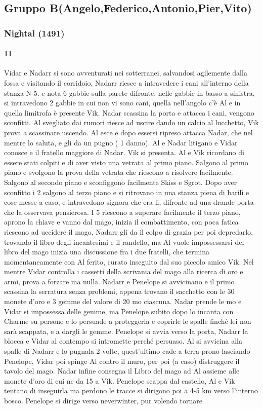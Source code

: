 \documentclass{article}
\begin{document}
          \subsection{Gruppo B(Angelo,Federico,Antonio,Pier,Vito)}
              \subsubsection{Nightal (1491)}
                  \paragraph{11}
Vidar e Nadarr si sono avventurati nei sotterranei, salvandosi agilemente dalla fossa e visitando il corridoio, Nadarr riesce a intravedere i cani all'interno della stanza N 5. e nota 6 gabbie sulla parete difronte, nelle gabbie in basso a sinistra, si intravedono 2 gabbie in cui non vi sono cani, quella nell'angolo c'è Al e in quella limitrofa è presente Vik. Nadar scassina la porta e attacca i cani, vengono sconfitti. Al svegliato dai rumori riesce ad uscire dando un calcio al lucchetto, Vik prova a scassinare uscendo. Al esce e dopo essersi ripreso attacca Nadar, che nel mentre lo saluta, e gli da un pugno ( 1 danno). Al e Nadar litigano e Vidar conosce e il fratello maggiore di Nadar. Vik si presenta. Al e Vik ricordano di essere stati colpiti e di aver visto una vetrata al primo piano. Salgono al primo piano e svolgono la prova della vetrata che riescono a risolvere facilmente. Salgono al secondo piano e sconfiggono facilmente Skiss e Sgrot. Dopo aver sconfitto i 2 salgono al terzo piano e si ritrovano in una stanza piena di barili e cose messe a caso, e intravedono signora che era li, difronte ad una drande porta che la osservava pensierosa. I 5 riescono a superare facilmente il terzo piano, aprono la chiave e vanno dal mago, inizia il combattimento, con poca fatica riescono ad uccidere il mago, Nadarr gli da il colpo di grazia per poi depredarlo, trovando il libro degli incantesimi e il randello, ma Al vuole impossessarsi del libro del mago inizia una discussione fra i due fratelli, che termina momentaneamente con Al ferito, curato inseguito dal suo piccolo amico Vik. Nel mentre Vidar controlla i cassetti della scrivania del mago alla ricerca di oro e armi, prova a forzare ma nulla. Nadarr e Penelope si avvicinano e il primo scassina la serratura senza problemi, appena trovano il sacchetto con le 30 monete d'oro e 3 gemme del valore di 20 mo ciascuna. Nadar prende le mo e Vidar si impossessa delle gemme, ma Penelope subito dopo lo incanta con Charme su persone e lo persuade a proteggerla e coprirle le spalle finché lei non sarà scappata, e a dargli le gemme. Penelope si avvia verso la porta, Nadarr la blocca e Vidar al contempo si intromette perché persuaso. Al si avvicina alla spalle di Nadarr e lo pugnala 2 volte, quest'ultimo cade a terra prono lasciando Penelope, Vidar poi spinge Al contro il muro, per poi (a caso) distruggere il tavolo del mago. Nadar infine consegna il Libro del mago ad Al assieme alle monete d'oro di cui ne da 15 a Vik. Penelope scappa dal castello, Al e Vik tentano di inseguirla ma perdono le tracce si dirigono poi a 4-5 km verso l'interno bosco. Penelope si dirige verso neverwinter, pur volendo tornare 
\end{document}

